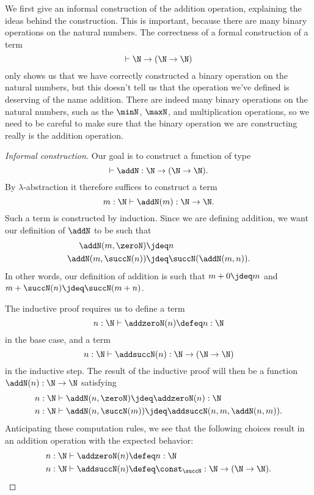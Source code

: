 We first give an informal construction of the addition operation, explaining the ideas behind the construction. This is important, because there are many binary operations on the natural numbers. The correctness of a formal construction of a term
\begin{equation*}
  \vdash \N\to(\N\to\N)
\end{equation*}
only shows us that we have correctly constructed a binary operation on the natural numbers, but this doesn't tell us that the operation we've defined is deserving of the name addition. There are indeed many binary operations on the natural numbers, such as the $\minN$, $\maxN$, and multiplication operations, so we need to be careful to make sure that the binary operation we are constructing really is the addition operation.

\begin{proof}[Informal construction]
  Our goal is to construct a function of type
  \begin{equation*}
    \vdash \addN:\N\to (\N\to\N).
  \end{equation*}
  By $\lambda$-abstraction it therefore suffices to construct a term
  \begin{equation*}
    m:\N\vdash \addN(m):\N\to\N.
  \end{equation*}
  Such a term is constructed by induction. Since we are defining addition, we want our definition of $\addN$ to be such that
  \begin{align*}
    \addN(m,\zeroN) & \jdeq n \\
    \addN(m,\succN(n)) & \jdeq \succN(\addN(m,n)). 
  \end{align*}
  In other words, our definition of addition is such that $m+0\jdeq m$ and $m+\succN(n)\jdeq \succN(m+n)$.

  The inductive proof requires us to define a term
  \begin{equation*}
    n:\N\vdash \addzeroN(n)\defeq n:\N
  \end{equation*}
  in the base case, and a term
  \begin{equation*}
    n:\N \vdash \addsuccN(n):\N\to(\N\to\N)
  \end{equation*}
  in the inductive step. The result of the inductive proof will then be a function $\addN(n):\N\to\N$ satisfying
  \begin{align*}
    n:\N & \vdash \addN(n,\zeroN) \jdeq \addzeroN(n) : \N \\
    n:\N & \vdash \addN(n,\succN(m)) \jdeq \addsuccN(n,m,\addN(n,m)).
  \end{align*}
  Anticipating these computation rules, we see that the following choices result in an addition operation with the expected behavior:
  \begin{align*}
    n:\N & \vdash \addzeroN(n)\defeq n : \N \\
    n:\N & \vdash \addsuccN(n)\defeq\const_{\succN}:\N\to(\N\to\N).\qedhere
  \end{align*}
\end{proof}

